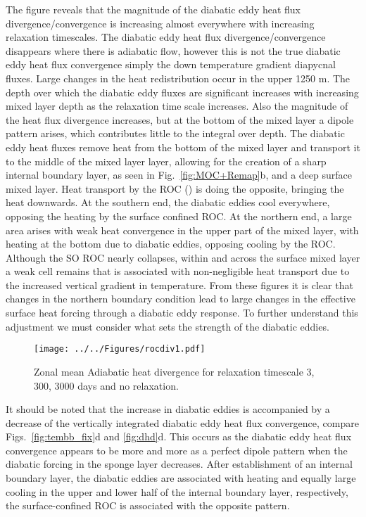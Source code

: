 The figure reveals that the magnitude of the diabatic eddy heat flux divergence/convergence is increasing almost everywhere with increasing relaxation timescales. The diabatic eddy heat flux divergence/convergence disappears where there is adiabatic flow, however this is not the true diabatic eddy heat flux convergence simply the down temperature gradient diapycnal fluxes. Large changes in the heat redistribution occur in the upper 1250 m. The depth over which the diabatic eddy fluxes are significant increases with increasing mixed layer depth as the relaxation time scale increases. Also the magnitude of the heat flux divergence increases, but at the bottom of the mixed layer a dipole pattern arises, which contributes little to the integral over depth. The diabatic eddy heat fluxes remove heat from the bottom of the mixed layer and transport it to the middle of the mixed layer layer, allowing for the creation of a sharp internal boundary layer, as seen in Fig.~\ref{fig:MOC+Remap}b, and a deep surface mixed layer. Heat transport by the ROC () is doing the opposite, bringing the heat downwards. At the southern end, the diabatic eddies cool everywhere, opposing the heating by the surface confined ROC. At the northern end, a large area arises with weak heat convergence in the upper part of the mixed layer, with heating at the bottom due to diabatic eddies, opposing cooling by the ROC. Although the SO ROC nearly collapses, within and across the surface mixed layer a weak cell remains that is associated with non-negligible heat transport due to the increased vertical gradient in temperature. From these figures it is clear that changes in the northern boundary condition lead to large changes in the effective surface heat forcing through a diabatic eddy response. To further understand this adjustment we must consider what sets the strength of the diabatic eddies.   
\begin{figure}
\noindent \texttt{[image: ../../Figures/rocdiv1.pdf]} 
\caption{Zonal mean Adiabatic heat divergence for relaxation timescale 3, 300, 3000 days and no relaxation.}
\label{fig:rhd}
\end{figure}

It should be noted that the increase in diabatic eddies is accompanied by a decrease of the vertically integrated diabatic eddy heat flux convergence, compare Figs.~\ref{fig:tembb_fix}d and \ref{fig:dhd}d. This occurs as the diabatic eddy heat flux convergence appears to be more and more as a perfect dipole pattern when the diabatic forcing in the sponge layer decreases. After establishment of an internal boundary layer, the diabatic eddies are associated with heating and equally large cooling in the upper and lower half of the internal boundary layer, respectively, the surface-confined ROC is associated with the opposite pattern. 

